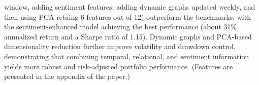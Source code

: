 window, adding sentiment features, adding dynamic graphs updated weekly, and then using PCA retaing 6 features out of 12) outperform the benchmarks, with the sentiment-enhanced model achieving the best performance (about 31\% annualized return and a Sharpe ratio of 1.15). Dynamic graphs and PCA-based dimensionality reduction further improve volatility and drawdown control, demonstrating that combining temporal, relational, and sentiment information yields more robust and risk-adjusted portfolio performance. (Features are presented in the appendix of the paper.)


